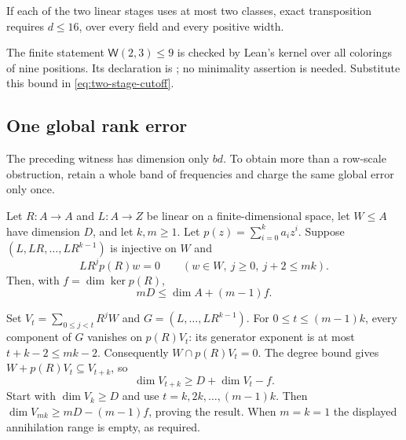 \begin{corollary}\label{cor:two-binary-classes}
If each of the two linear stages uses at most two classes, exact
transposition requires $d\le16$, over every field and every positive width.
\end{corollary}
\begin{outline}
The finite statement $\mathsf W(2,3)\le9$ is checked by Lean's kernel
over all colorings of nine positions.  Its declaration is
; no minimality assertion is needed.
Substitute this bound in \cref{eq:two-stage-cutoff}.
\end{outline}

\subsection{One global rank error}

The preceding witness has dimension only $bd$.  To obtain more than a
row-scale obstruction, retain a whole band of frequencies and charge the
same global error only once.

\begin{lemma}\label{lem:recurrence-growth}
Let $R\colon A\to A$ and $L\colon A\to Z$ be linear on a
finite-dimensional space, let $W\le A$ have dimension $D$, and let
$k,m\ge1$.  Let $p(z)=\sum_{i=0}^k a_i z^i$.
Suppose $(L,LR,\ldots,LR^{k-1})$ is injective on $W$ and
\[
 LR^jp(R)w=0\qquad(w\in W,\ j\ge0,\ j+2\le mk).
\]
Then, with $f=\dim\ker p(R)$,
\begin{equation}\label{eq:recurrence-growth}
 mD\le\dim A+(m-1)f.
\end{equation}
\end{lemma}
\begin{outline}
Set $V_t=\sum_{0\le j<t}R^jW$ and $G=(L,\ldots,LR^{k-1})$.
For $0\le t\le(m-1)k$, every component of $G$ vanishes on
$p(R)V_t$: its generator exponent is at most $t+k-2\le mk-2$.
Consequently $W\cap p(R)V_t=0$.
The degree bound gives $W+p(R)V_t\subseteq V_{t+k}$, so
\[
 \dim V_{t+k}\ge D+\dim V_t-f.
\]
Start with $\dim V_k\ge D$ and use $t=k,2k,\ldots,(m-1)k$.
Then $\dim V_{mk}\ge mD-(m-1)f$, proving the result.  When $m=k=1$
the displayed annihilation range is empty, as required.
\end{outline}

